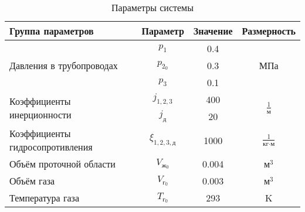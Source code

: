 \begin{table}[H]
    \caption{Параметры системы}
    \label{tab:1-problem-2}
    \centering
    \begin{tabular}{ |l|c|c|c| }
        \hline \textbf{Группа параметров} & \textbf{Параметр} & \textbf{Значение} & \textbf{Размерность} \\
        \hline \multirow{3}{*}{Давления в трубопроводах} & $p_{1}$ & 0.4 &  \\
        \cline{2-3} \multirow{3}{*}{} & $p_{2_0}$ & 0.3 & МПа \\
        \cline{2-3} \multirow{3}{*}{} & $p_{3}$ & 0.1 &  \\
        
        \hline \multirow{2}{*}{Коэффициенты инерционности} & $j_{1,2,3}$    & 400 & \multirow{2}{*}{ $\frac{1}{\text{м}}$ } \\
        \cline{2-3} \multirow{2}{*}{} & $j_{\text{д}}$ & 20  & \multirow{2}{*}{} \\

        \hline Коэффициенты гидросопротивления & $\xi_{1,2,3,\text{д}}$ & 1000 & $\frac{1}{\text{кг} \cdot \text{м}}$ \\

        \hline Объём проточной области & $V_{\text{ж}_0}$ & 0.004 & $\text{м}^3$ \\

        \hline Объём газа & $V_{\text{г}_0}$ & 0.003 & $\text{м}^3$ \\
        \hline Температура газа & $T_{\text{г}_0}$ & 293 & K \\
        \hline
    \end{tabular}
\end{table}